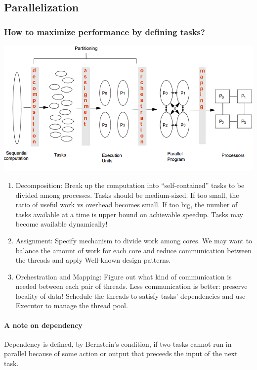 \documentclass{article}
\begin{document}
\subsection{Parallelization}
\subsubsection{How to maximize performance by defining tasks?}

\begin{center}
\includegraphics[scale=0.7]{img/parallelization.png}    
\end{center}

\begin{enumerate}
    \item Decomposition: Break up the computation into “self-contained” tasks to be divided among processes. Tasks should be medium-sized. If too small, the ratio of useful work vs overhead becomes small. If too big, the number of tasks available at a time is upper bound on achievable speedup. Tasks may become available dynamically!
    \item Assignment: Specify mechanism to divide work among cores. We may want to balance the amount of work for each core and reduce communication between the threads and apply Well-known design patterns.
    \item Orchestration and Mapping: Figure out what kind of communication is needed between each pair of threads. Less communication is better: preserve locality of data! Schedule the threads to satisfy tasks' dependencies and use Executor to manage the thread pool.
\end{enumerate}

\paragraph{A note on dependency} Dependency is defined, by Bernstein's condition, if two tasks cannot run in parallel because of some action or output that preceeds the input of the next task.
\end{document}
